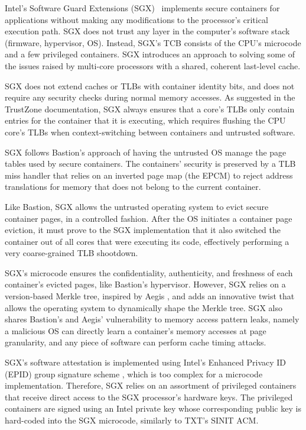 Intel's Software Guard Extensions (SGX)~\cite{mckeen2013sgx, anati2013sgx,
hoekstra2013sgx} implements secure containers for applications without making
any modifications to the processor's critical execution path. SGX does not
trust any layer in the computer's software stack (firmware, hypervisor, OS).
Instead, SGX's TCB consists of the CPU's microcode and a few privileged
containers. SGX introduces an approach to solving some of the issues raised by
multi-core processors with a shared, coherent last-level cache.

SGX does not extend caches or TLBs with container identity bits, and does not
require any security checks during normal memory accesses. As suggested in the
TrustZone documentation, SGX always ensures that a core's TLBs only contain
entries for the container that it is executing, which requires flushing the CPU
core's TLBs when context-switching between containers and untrusted software.

SGX follows Bastion's approach of having the untrusted OS manage the page
tables used by secure containers. The containers' security is preserved by a
TLB miss handler that relies on an inverted page map (the EPCM) to reject
address translations for memory that does not belong to the current container.

Like Bastion, SGX allows the untrusted operating system to evict secure
container pages, in a controlled fashion. After the OS initiates a container
page eviction, it must prove to the SGX implementation that it also switched
the container out of all cores that were executing its code, effectively
performing a very coarse-grained TLB shootdown.

SGX's microcode ensures the confidentiality, authenticity, and freshness of
each container's evicted pages, like Bastion's hypervisor. However, SGX relies
on a version-based Merkle tree, inspired by Aegis \cite{suh2003aegis}, and adds
an innovative twist that allows the operating system to dynamically shape the
Merkle tree. SGX also shares Bastion's and Aegis' vulnerability to memory
access pattern leaks, namely a malicious OS can directly learn a container's
memory accesses at page granularity, and any piece of software can perform
cache timing attacks.

SGX's software attestation is implemented using Intel's Enhanced Privacy ID
(EPID) group signature scheme \cite{brickell2009epid}, which is too complex for
a microcode implementation. Therefore, SGX relies on an assortment of
privileged containers that receive direct access to the SGX processor's
hardware keys. The privileged containers are signed using an Intel private key
whose corresponding public key is hard-coded into the SGX microcode, similarly
to TXT's SINIT ACM.


